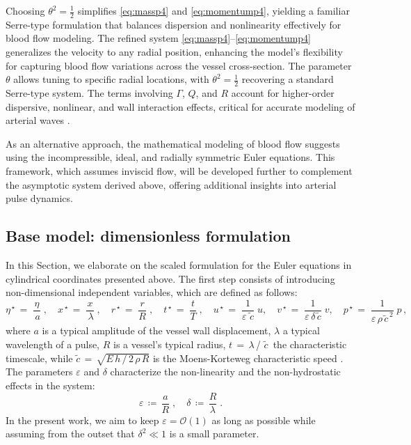 \documentclass[alpha-refs, 12pt]{wiley-article}
\renewcommand{\O}{\mathcal{O}}
\newcommand{\eps}{\varepsilon}
\begin{document}
Choosing $\theta^2 = \frac{1}{2}$ simplifies \eqref{eq:massp4} and \eqref{eq:momentump4}, yielding a familiar Serre-type formulation that balances dispersion and nonlinearity effectively for blood flow modeling. The refined system \eqref{eq:massp4}--\eqref{eq:momentump4} generalizes the velocity to any radial position, enhancing the model's flexibility for capturing blood flow variations across the vessel cross-section. The parameter $\theta$ allows tuning to specific radial locations, with $\theta^2 = \frac{1}{2}$ recovering a standard Serre-type system. The terms involving $\Gamma$, $Q$, and $R$ account for higher-order dispersive, nonlinear, and wall interaction effects, critical for accurate modeling of arterial waves \cite{Mitsotakis2019}.

As an alternative approach, the mathematical modeling of blood flow suggests using the incompressible, ideal, and radially symmetric Euler equations. This framework, which assumes inviscid flow, will be developed further to complement the asymptotic system derived above, offering additional insights into arterial pulse dynamics.

\subsection{Base model: dimensionless formulation}

In this Section, we elaborate on the scaled formulation for the Euler equations in cylindrical coordinates presented above. The first step consists of introducing non-dimensional independent variables, which are defined as follows:
\begin{equation*}
  \eta^{\,\star}\,=\;\frac{\eta}{\,a}\;,\quad x^{\,\star}\,=\;\frac{x}{\,\lambda}\;,\quad r^{\,\star}\,=\;\frac{r}{R}\;,\quad t^{\,\star}\,=\;\frac{t}{T}\;,\quad u^{\,\star}\,=\;\frac{1}{\eps\, \tilde{\,c}}\;u, \quad v^{\,\star}\,=\;\frac{1}{\eps\,\delta\,\tilde{c}}\;v, \quad p^{\,\star}\,=\;\frac{1}{\eps\,\rho\, \tilde{c}^{\,2}}\;p\,,
\end{equation*}
where $a$ is a typical amplitude of the vessel wall displacement, $\lambda$ a typical wavelength of a pulse, $R$ is a vessel's typical radius, $ t\,=\,\lambda$\,/\,\,$\tilde{c}\,$ the characteristic timescale, while $\tilde{c}\,=\,\sqrt{E\,h\,/\,2\, \rho\,R}$ is the Moens-Korteweg characteristic speed \cite{Fung1997a}. The parameters $\eps$ and $\delta$ characterize the non-linearity and the non-hydrostatic effects in the system:
\begin{equation*}
  \eps\,\coloneqq\, \frac{a}{R}\;, \quad \delta\,\coloneqq\,\frac{R}{\lambda}\;.
\end{equation*}
In the present work, we aim to keep $\eps = \O(1)$ as long as possible while assuming from the outset that $\delta^2 \ll 1$ is a small parameter.
\end{document}
